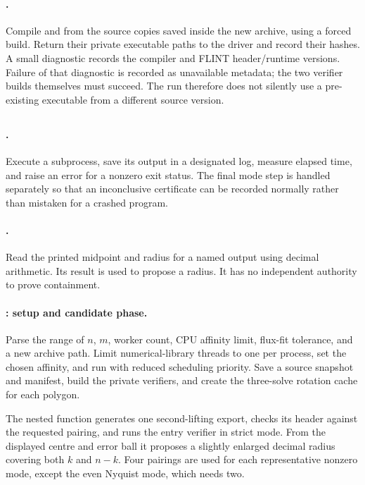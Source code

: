 \paragraph{.}
Compile  and  from the source
copies saved inside the new archive, using a forced build. Return their
private executable paths to the driver and record their hashes. A small
diagnostic records the compiler and FLINT header/runtime versions. Failure
of that diagnostic is recorded as unavailable metadata; the two verifier
builds themselves must succeed. The run therefore does not silently use
a pre-existing executable from a different source version.

\subsection{}
\paragraph{.}
Execute a subprocess, save its output in a designated log, measure elapsed
time, and raise an error for a nonzero exit status. The final mode step is
handled separately so that an inconclusive certificate can be recorded
normally rather than mistaken for a crashed program.

\paragraph{.}
Read the printed midpoint and radius for a named output using decimal
arithmetic. Its result is used to propose a radius. It has no independent
authority to prove containment.

\paragraph{: setup and candidate phase.}
Parse the range of $n$, $m$, worker count, CPU affinity limit, flux-fit
tolerance, and a new archive path. Limit numerical-library threads to one
per process, set the chosen affinity, and run with reduced scheduling
priority. Save a source snapshot and manifest, build the private verifiers,
and create the three-solve rotation cache for each polygon.

The nested function  generates one second-lifting export,
checks its header against the requested pairing, and runs the entry
verifier in strict mode. From the displayed centre and error ball it
proposes a slightly enlarged decimal radius covering both $k$ and $n-k$.
Four pairings are used for each representative nonzero mode, except the
even Nyquist mode, which needs two.

